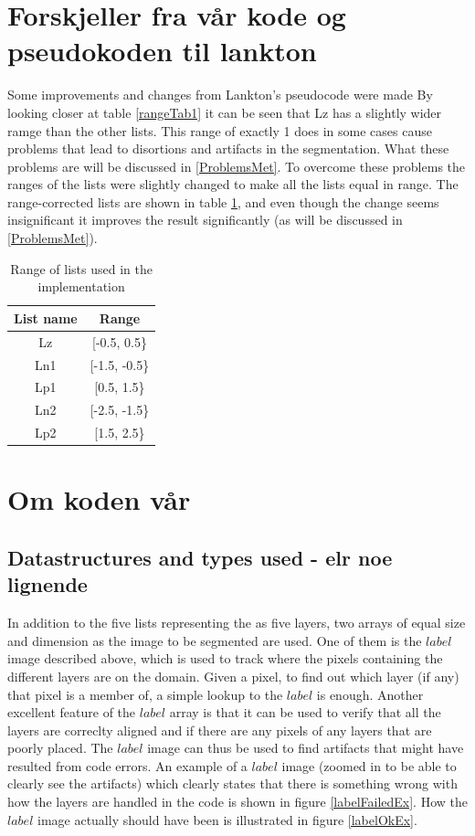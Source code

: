 \section{Forskjeller fra vår kode og pseudokoden til lankton}
Some improvements and changes from Lankton's pseudocode were made
By looking closer at table \ref{rangeTab1} it can be seen that Lz has a slightly wider ramge than the other lists. This range of exactly 1 does in some cases cause problems that lead to disortions and artifacts in the segmentation. What these problems are will be discussed in \ref{ProblemsMet}. To overcome these problems the ranges of the lists were slightly changed to make all the lists equal in range. The range-corrected lists are shown in table \ref{rangeTab2}, and even though the change seems insignificant it improves the result significantly (as will be discussed in \ref{ProblemsMet}).

\begin{table}[h] %
	\begin{tabular}{| c | c |} 
	\hline
	List name & Range\\
	\hline
	Lz & [-0.5, 0.5\}\\
	Ln1 & [-1.5, -0.5\}\\
	Lp1 & [0.5, 1.5\}\\
	Ln2 & [-2.5, -1.5\}\\
	Lp2 & [1.5, 2.5\}\\
	\hline
	\end{tabular}
	\caption{Range of lists used in the implementation}
	\label{rangeTab2}
\end{table}

\section{Om koden vår}
\subsection{Datastructures and types used - elr noe lignende}
In addition to the five lists representing the as five layers, two arrays of equal size and dimension as the image to be segmented are used. One of them is the $label$ image described above, which is used to track where the pixels containing the different layers are on the domain. Given a pixel, to find out which layer (if any) that pixel is a member of, a simple lookup to the $label$ is enough. Another excellent feature of the $label$ array is that it can be used to verify that all the layers are correclty aligned and if there are any pixels of any layers that are poorly placed. The $label$ image can thus be used to find artifacts that might have resulted from code errors. An example of a $label$ image (zoomed in to be able to clearly see the artifacts) which clearly states that there is something wrong with how the layers are handled in the code is shown in figure \ref{labelFailedEx}. How the $label$ image actually should have been is illustrated in figure \ref{labelOkEx}.

